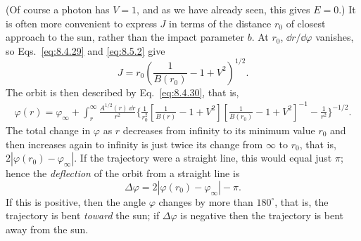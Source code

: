 (Of course a photon has \(V=1\), and as we have already seen, this gives
\(E=0\).) It is often more convenient to express \(J\) in terms of the
distance \(r_0\) of closest approach to the sun, rather than the impact
parameter \(b\). At \(r_0\), \(\dd r/\dd\varphi\) vanishes, so
Eqs.~\eqref{eq:8.4.29} and \eqref{eq:8.5.2} give
\begin{equation}
  J
  =
  r_0\left(\frac{1}{B(r_0)}-1+V^2\right)^{1/2}.
  \tag{8.5.3}\label{eq:8.5.3}
\end{equation}
The orbit is then described by Eq.~\eqref{eq:8.4.30}, that is,
\begin{equation}
  \begin{split}
  \varphi(r)
  =\varphi_\infty
  +\int_r^\infty
  \frac{A^{1/2}(r)\,\dd r}{r^2}
  \biggl\{
  \frac{1}{r_0^2}
  \left[\frac{1}{B(r)}-1+V^2\right]
  \left[\frac{1}{B(r_0)}-1+V^2\right]^{-1}
  -\frac{1}{r^2}
  \biggr\}^{-1/2}.
  \end{split}
  \tag{8.5.4}\label{eq:8.5.4}
\end{equation}
The total change in \(\varphi\) as \(r\) decreases from infinity to its
minimum value \(r_0\) and then increases again to infinity is just twice
its change from \(\infty\) to \(r_0\), that is,
\(2|\varphi(r_0)-\varphi_\infty|\). If the trajectory were a straight
line, this would equal just \(\pi\); hence the \emph{deflection} of the
orbit from a straight line is
\begin{equation}
  \Delta\varphi
  =
  2|\varphi(r_0)-\varphi_\infty|-\pi.
  \tag{8.5.5}\label{eq:8.5.5}
\end{equation}
If this is positive, then the angle \(\varphi\) changes by more than
\(180^\circ\), that is, the trajectory is bent \emph{toward} the sun; if
\(\Delta\varphi\) is negative then the trajectory is bent away from the
sun.

